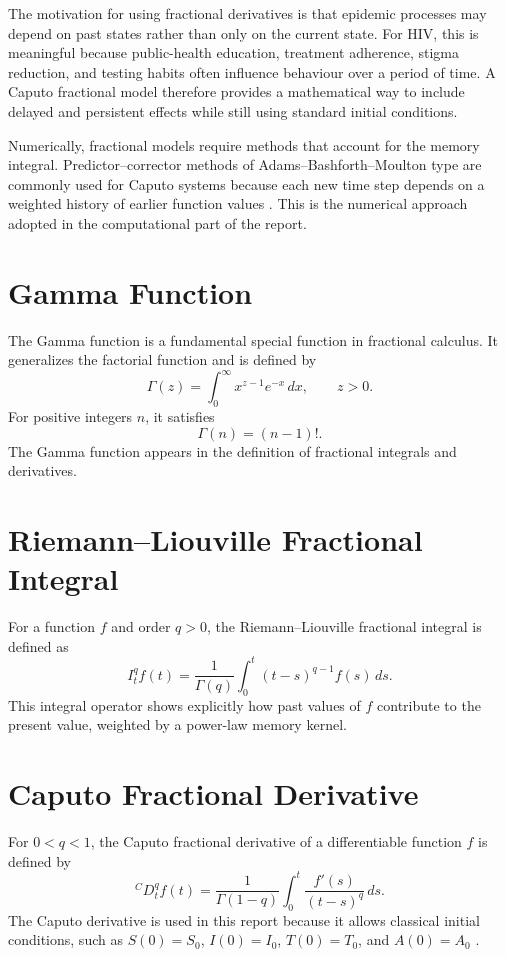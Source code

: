 \documentclass[12pt,a4paper,oneside]{report}
\newcommand{\CaputoD}[2]{{}^{C}D_{#1}^{#2}}
\begin{document}
The motivation for using fractional derivatives is that epidemic processes may depend on past states rather than only on the current state. For HIV, this is meaningful because public-health education, treatment adherence, stigma reduction, and testing habits often influence behaviour over a period of time. A Caputo fractional model therefore provides a mathematical way to include delayed and persistent effects while still using standard initial conditions.

Numerically, fractional models require methods that account for the memory integral. Predictor--corrector methods of Adams--Bashforth--Moulton type are commonly used for Caputo systems because each new time step depends on a weighted history of earlier function values \citep{Diethelm2002,Diethelm2010}. This is the numerical approach adopted in the computational part of the report.

\newpage 

\section{Gamma Function}
The Gamma function is a fundamental special function in fractional calculus. It generalizes the factorial function and is defined by
\begin{equation}
\Gamma(z)=\int_0^\infty x^{z-1}e^{-x}\,dx, \qquad z>0.
\end{equation}
For positive integers $n$, it satisfies
\begin{equation}
\Gamma(n)=(n-1)!.
\end{equation}
The Gamma function appears in the definition of fractional integrals and derivatives.


\section{Riemann--Liouville Fractional Integral}
For a function $f$ and order $q>0$, the Riemann--Liouville fractional integral is defined as
\begin{equation}
I_t^q f(t)=\frac{1}{\Gamma(q)}\int_0^t (t-s)^{q-1}f(s)\,ds.
\end{equation}
This integral operator shows explicitly how past values of $f$ contribute to the present value, weighted by a power-law memory kernel.

\section{Caputo Fractional Derivative}
For $0<q<1$, the Caputo fractional derivative of a differentiable function $f$ is defined by
\begin{equation}
\CaputoD{t}{q}f(t)=\frac{1}{\Gamma(1-q)}\int_0^t \frac{f'(s)}{(t-s)^q}\,ds.
\label{eq:caputo_definition}
\end{equation}
The Caputo derivative is used in this report because it allows classical initial conditions, such as $S(0)=S_0$, $I(0)=I_0$, $T(0)=T_0$, and $A(0)=A_0$ \citep{Caputo1967,Diethelm2010}.
\end{document}
